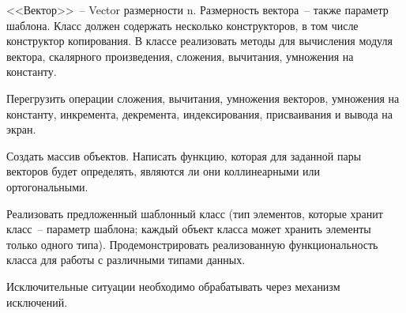 
<<Вектор>>~-- Vector размерности n. Размерность вектора~-- также параметр шаблона. Класс
должен содержать несколько конструкторов, в том числе конструктор копирования. В
классе реализовать методы для вычисления модуля вектора, скалярного произведения,
сложения, вычитания, умножения на константу.

Перегрузить операции сложения,
вычитания, умножения векторов, умножения на константу, инкремента, декремента,
индексирования, присваивания и вывода на экран.

Создать массив объектов. Написать
функцию, которая для заданной пары векторов будет определять, являются ли они
коллинеарными или ортогональными.

Реализовать предложенный шаблонный класс (тип элементов, которые
хранит класс~-- параметр шаблона; каждый объект класса может хранить
элементы только одного типа). Продемонстрировать реализованную
функциональность класса для работы с различными типами данных.


Исключительные ситуации необходимо обрабатывать через механизм исключений.
